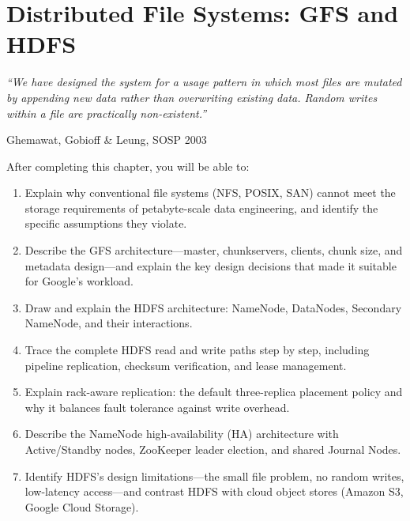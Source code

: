 
\chapter{Distributed File Systems: GFS and HDFS}
\label{ch:hdfs}

\epigraph{\textit{``We have designed the system for a usage pattern in which
most files are mutated by appending new data rather than overwriting
existing data. Random writes within a file are practically non-existent.''}}{Ghemawat, Gobioff \& Leung, SOSP 2003}

\vspace{4pt}

\begin{chapterlearning}
After completing this chapter, you will be able to:
\begin{enumerate}
  \item Explain why conventional file systems (NFS, POSIX, SAN) cannot
        meet the storage requirements of petabyte-scale data engineering,
        and identify the specific assumptions they violate.
  \item Describe the GFS architecture---master, chunkservers, clients,
        chunk size, and metadata design---and explain the key design
        decisions that made it suitable for Google's workload.
  \item Draw and explain the HDFS architecture: NameNode, DataNodes,
        Secondary NameNode, and their interactions.
  \item Trace the complete HDFS read and write paths step by step,
        including pipeline replication, checksum verification, and
        lease management.
  \item Explain rack-aware replication: the default three-replica
        placement policy and why it balances fault tolerance against
        write overhead.
  \item Describe the NameNode high-availability (HA) architecture with
        Active/Standby nodes, ZooKeeper leader election, and shared
        Journal Nodes.
  \item Identify HDFS's design limitations---the small file problem,
        no random writes, low-latency access---and contrast HDFS
        with cloud object stores (Amazon S3, Google Cloud Storage).
\end{enumerate}
\end{chapterlearning}


